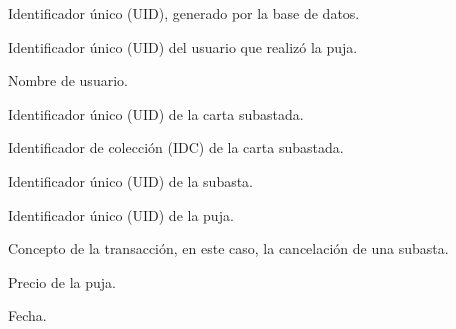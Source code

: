 \begin{RFSubastas}
\begin{RFSubastas}
\begin{RFSubastas}
		\begin{RFSubastas}
			\item Identificador único (UID), generado por la base de datos.
			\item Identificador único (UID) del usuario que realizó la puja.
			\item Nombre de usuario.
			\item Identificador único (UID) de la carta subastada.
			\item Identificador de colección (IDC) de la carta subastada.
			\item Identificador único (UID) de la subasta.
			\item Identificador único (UID) de la puja.
			\item Concepto de la transacción, en este caso, la cancelación de una subasta.
			\item Precio de la puja.
			\item Fecha.
		\end{RFSubastas}


\end{RFSubastas}
\end{RFSubastas}
\end{RFSubastas}
